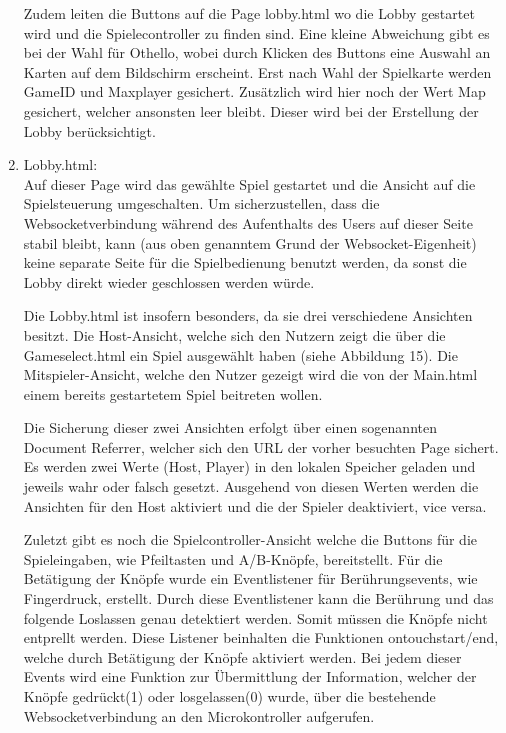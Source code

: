 \documentclass[12pt,a4paper]{article}
\begin{document}
\begin{enumerate}
Zudem leiten die Buttons auf die Page \glqq lobby.html\grqq{} wo die Lobby gestartet wird und die Spielecontroller zu finden sind. Eine kleine Abweichung gibt es bei der Wahl für Othello, wobei durch Klicken des Buttons eine Auswahl an Karten auf dem Bildschirm erscheint. Erst nach Wahl der Spielkarte werden GameID und Maxplayer gesichert. Zusätzlich wird hier noch der Wert \glqq Map\grqq{} gesichert, welcher ansonsten leer bleibt. Dieser wird bei der Erstellung der Lobby berücksichtigt.
	
\item{Lobby.html:}\\
Auf dieser Page wird das gewählte Spiel gestartet und die Ansicht auf die Spielsteuerung umgeschalten. Um sicherzustellen, dass die Websocketverbindung während des Aufenthalts des Users auf dieser Seite stabil bleibt, kann (aus oben genanntem Grund der Websocket-Eigenheit) keine separate Seite für die Spielbedienung benutzt werden, da sonst die Lobby direkt wieder geschlossen werden würde. 

Die Lobby.html ist insofern besonders, da sie drei verschiedene Ansichten besitzt. Die Host-Ansicht, welche sich den Nutzern zeigt die über die Gameselect.html ein Spiel ausgewählt haben (siehe Abbildung 15). Die Mitspieler-Ansicht, welche den Nutzer gezeigt wird die von der Main.html einem bereits gestartetem Spiel beitreten wollen. 

Die Sicherung dieser zwei Ansichten erfolgt über einen sogenannten \glqq Document Referrer\grqq{}, welcher sich den URL der vorher besuchten Page sichert. Es werden zwei Werte (Host, Player) in den lokalen Speicher geladen und jeweils wahr oder falsch gesetzt. Ausgehend von diesen Werten werden die Ansichten für den Host aktiviert und die der Spieler deaktiviert, vice versa. 

Zuletzt gibt es noch die Spielcontroller-Ansicht welche die Buttons für die Spieleingaben, wie Pfeiltasten und A/B-Knöpfe, bereitstellt. Für die Betätigung der Knöpfe wurde ein \glqq Eventlistener\grqq{} für Berührungsevents, wie Fingerdruck, erstellt. Durch diese Eventlistener kann die Berührung und das folgende Loslassen genau detektiert werden. Somit müssen die Knöpfe nicht entprellt werden. Diese Listener beinhalten die Funktionen \glqq ontouchstart/end\grqq{}, welche durch Betätigung der Knöpfe aktiviert werden. Bei jedem dieser Events wird eine Funktion zur Übermittlung der Information, welcher der Knöpfe gedrückt(1) oder losgelassen(0) wurde, über die bestehende Websocketverbindung an den Microkontroller aufgerufen.


\end{enumerate}
\end{document}

